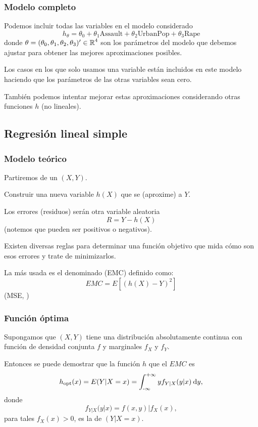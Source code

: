 \subsubsection{Modelo completo}

Podemos incluir todas las variables en el modelo considerado \[ h_\theta=\theta_0+\theta_1\text{Assault}+\theta_2\text{UrbanPop}+\theta_3\text{Rape} \]donde $\theta=(\theta_0,\theta_1,\theta_2,\theta_3)'\in\operatorname{\mathbb{R}}^4$ son los parámetros del modelo que debemos ajustar para obtener las mejores aproximaciones posibles.

Los casos en los que solo usamos una variable están incluidos en este modelo haciendo que los parámetros de las otras variables sean cero.

También podemos intentar mejorar estas aproximaciones considerando otras funciones $h$ (no lineales).

\subsection{Regresión lineal simple}
\subsubsection{Modelo teórico}
Partiremos de un \vea $(X,Y)$.

 Construir una nueva variable $h(X)$ que se  (aproxime) a $Y$.

Los errores (residuos) serán otra variable aleatoria \[ R=Y-h(X) \](notemos que pueden ser positivos o negativos).

Existen diversas reglas para determinar una función objetivo que mida cómo son esos errores y trate de minimizarlos.

La más usada es el denominado  (EMC) definido como: \[ EMC=E\left[(h(X)-Y)^2\right] \] (MSE, )

\subsubsection{Función óptima}

Supongamos que $(X,Y)$ tiene una distribución absolutamente continua con función de densidad conjunta $f$ y marginales $f_X$ y $f_Y$.

Entonces se puede demostrar que la función $h$ que  el $EMC$ es \[ h_{\mathrm{opt}}(x)=E(Y|X=x)=\operatorname{\int_{-\infty}^{+\infty}} yf_{Y|X}(y|x)\:\mathrm{d}y, \]donde\[ f_{Y|X}(y|x)=f(x,y)|f_X(x), \] para tales $f_X(x)>0$, es la  de $(Y|X=x)$.

